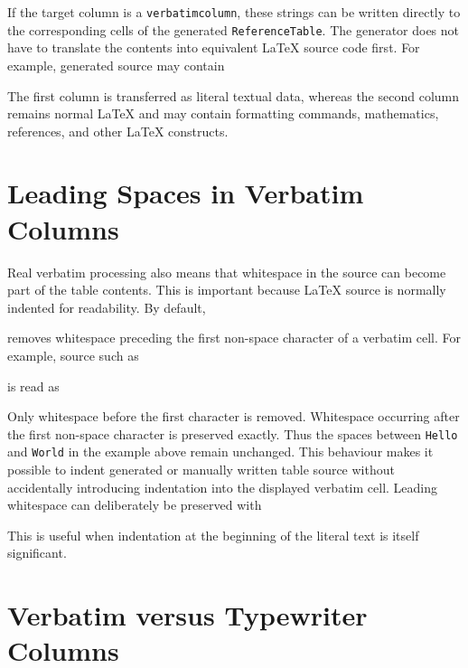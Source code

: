 \documentclass[
11pt,
a4paper,
oneside
]{scrbook}
\begin{document}
If the target column is a \texttt{verbatimcolumn}, these strings can be
written directly to the corresponding cells of the generated
\texttt{ReferenceTable}. The generator does not have to translate the
contents into equivalent \LaTeX{} source code first.
For example, generated source may contain





The first column is transferred as literal textual data, whereas the second
column remains normal \LaTeX{} and may contain formatting commands,
mathematics, references, and other \LaTeX{} constructs.

\section{Leading Spaces in Verbatim Columns}

Real verbatim processing also means that whitespace in the source can become
part of the table contents. This is important because \LaTeX{} source is
normally indented for readability.
By default,




removes whitespace preceding the first non-space character of a verbatim
cell.
For example, source such as




is read as




Only whitespace before the first character is removed. Whitespace occurring
after the first non-space character is preserved exactly. Thus the spaces
between \texttt{Hello} and \texttt{World} in the example above remain
unchanged.
This behaviour makes it possible to indent generated or manually written
table source without accidentally introducing indentation into the displayed
verbatim cell.
Leading whitespace can deliberately be preserved with




This is useful when indentation at the beginning of the literal text is
itself significant.

\section{Verbatim versus Typewriter Columns}
\end{document}
